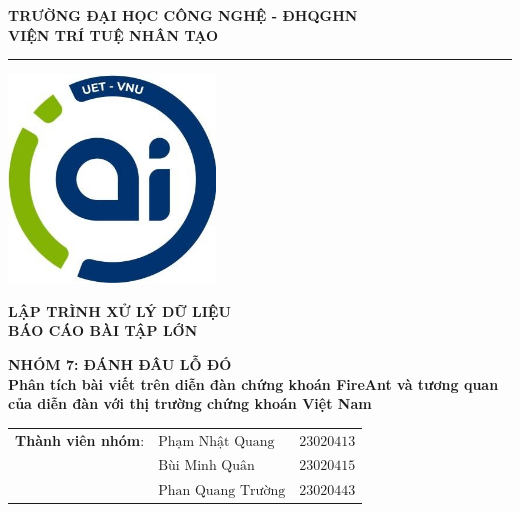 \documentclass[30pt]{report}
\begin{document}
\begin{titlepage}
\begin{center}
    \Large{\textbf{TRƯỜNG ĐẠI HỌC CÔNG NGHỆ - ĐHQGHN}}\\
    \Large{ \textbf{VIỆN TRÍ TUỆ NHÂN TẠO}}\\
    
    \vspace{0.5cm}
    \rule{0.5\textwidth}{0.4pt}

    \vspace{2cm}
    \includegraphics[width=5.5cm]{iai-logo.jpg}

    \vspace{1cm}
    \huge\textbf{LẬP TRÌNH XỬ LÝ DỮ LIỆU}\\
    \huge\textbf{BÁO CÁO BÀI TẬP LỚN}

    \vspace{2cm}
    \Large {\textbf{NHÓM 7: ĐÁNH ĐÂU LỖ ĐÓ}}\\
    \vspace{0.3cm}
    \Large {\textbf{Phân tích bài viết trên diễn đàn chứng khoán FireAnt và tương quan của diễn đàn với thị trường chứng khoán Việt Nam}}\\
    
    \vspace{2.5cm}
    \begin{tabular}{llr}
        \textbf{Thành viên nhóm}: & $\text{Phạm Nhật Quang}$ &$\text{23020413}$\\
                   & $\text{Bùi Minh Quân}$ &$\text{23020415}$\\
                   & $\text{Phan Quang Trường}$ &$\text{23020443}$\\\end{tabular}

\vspace{1.5cm}

\end{center}
\end{titlepage}



\tableofcontents










\nocite{*}

\end{document}
